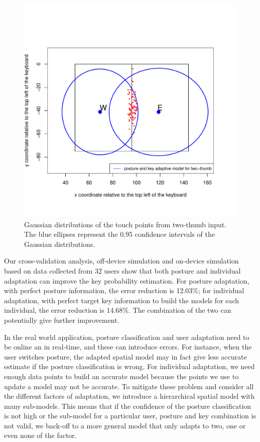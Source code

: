 \documentclass{sigchi}
\begin{document}
\begin{figure}[tb]
 \includegraphics[width=0.9\columnwidth]{figures/ellipses-two-thumb.pdf}
  \caption{Gaussian distributions of the touch points from two-thumb input. The
  blue ellipses represent the 0.95 confidence intervals of the Gaussian
  distributions.}
  \label{fig:e-w-ellipses-1}
\end{figure}

Our cross-validation analysis, off-device simulation and on-device simulation based
on data collected from 32 users show
that both posture and individual adaptation can improve the key probability estimation. For posture 
adaptation, with perfect posture information, the error reduction is 12.03\%; for individual adaptation, with perfect
target key information to build the models for each individual, the error reduction is 14.68\%. The combination of the two 
can potentially give further improvement. 

In the real world application, posture classification and user adaptation need to be
online an in real-time, and these can introduce errors. For instance, when the user switches posture,
the adapted spatial model may in fact give less accurate estimate if the posture classification
is wrong. For individual adaptation, we need enough data points to build
an accurate model because the points we use to update a model may not be accurate. 
To mitigate these problem and consider all the different factors of adaptation, we 
introduce a hierarchical spatial model with many sub-models.  
This means that if the confidence of the posture classification is not high or the sub-model for a particular user, posture and key combination is 
not valid, we back-off to a more general model that only adapts to two, one or even none of 
the factor. 
\end{document}
